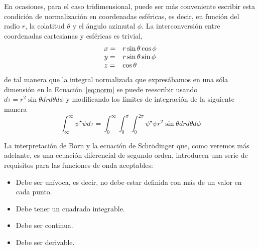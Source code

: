 En ocasiones, para el caso tridimensional, puede 
ser más conveniente escribir esta condición de 
normalización en coordenadas esféricas, es decir,
en función del radio $r$, la colatitud $\theta$
y el ángulo azimutal $\phi$. La interconversión
entre coordenadas cartesianas y esféricas es 
trivial, 
\begin{equation}
  \begin{array}{@{}ll@{}}
    x = & r\sin\theta\cos\phi \\
    y = & r\sin\theta\sin\phi \\
    z = & \cos \theta
  \end{array}
\end{equation}
de tal manera que la integral normalizada que 
expresábamos en una sóla dimensión en la 
Ecuación~\ref{eq:norm} se puede reescribir usando
$d\tau=r^2\sin\theta drd\theta d\phi$ y modificando
los límites de integración de la siguiente manera
\begin{equation}
    \int_\infty^\infty\psi^\star\psi d\tau=
    \int_0^\infty\int_0^\pi\int_0^{2\pi}\psi^\star\psi r^2\sin\theta drd\theta d\phi
\end{equation}

La interpretación de Born y la ecuación de Schrödinger
que, como veremos más adelante, es una ecuación
diferencial de segundo orden, introducen una serie de
requisitos para las funciones de onda aceptables:
\begin{itemize}
    \item Debe ser unívoca, es decir, no debe 
    estar definida con más de un valor en cada punto.
    \item Debe tener un cuadrado integrable.
    \item Debe ser continua.
    \item Debe ser derivable.
\end{itemize}


